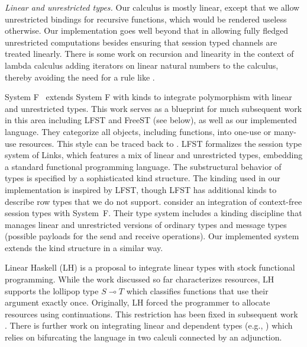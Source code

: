 \smallskip
\emph{Linear and unrestricted types.}
Our 
calculus is mostly linear, except that we
allow unrestricted bindings for recursive functions, which would be
rendered useless otherwise. 
Our implementation goes well beyond that in
allowing fully fledged unrestricted computations besides ensuring that
session typed channels are treated linearly.
%
There is some work on recursion and linearity in the context of lambda calculus
\cite{DBLP:journals/lisp/AlvesFFM10}
adding iterators on
linear natural numbers to the calculus, thereby avoiding the need for
a rule like {}.

System F\textdegree~\cite{DBLP:conf/tldi/MazurakZZ10}
extends System F with kinds to integrate polymorphism with linear and
unrestricted types. This work serves as a blueprint for much
subsequent work in this area including LFST and FreeST (see below), as well as our
implemented language.
They categorize all objects, including functions, into one-use or
many-use resources. This style can be traced back to 
\citet{walker:substructural-type-systems}. 
%
LFST \cite{lindley17:_light_funct_session_types} formalizes the
session type system of Links, which features a mix of linear and
unrestricted types, embedding a standard functional programming
language. The substructural behavior of types is specified by a
sophisticated kind structure.  The kinding used in our implementation
is inspired by LFST, though LFST has additional kinds to describe row
types that we do not support.
%
\citet{DBLP:journals/corr/abs-2106-06658}
consider an integration of context-free session types with
System~F. Their type system includes a kinding discipline that manages
linear and unrestricted versions of ordinary types and
message types (possible payloads for the send and receive
operations). Our implemented system extends the kind structure in a
similar way.

Linear Haskell (LH) \cite{DBLP:journals/pacmpl/BernardyBNJS18}
is a proposal to integrate linear types with stock functional
programming. While the work discussed so far characterizes resources,
LH supports the lollipop type $S \multimap T$ which classifies
functions that use their argument exactly once. Originally, LH forced
the programmer to allocate resources using continuations. This restriction
has been fixed in subsequent work \cite{DBLP:journals/pacmpl/SpiwackKBWE22}.
%
There is further work on integrating linear and dependent types (e.g.,
\cite{DBLP:conf/popl/KrishnaswamiPB15}) which relies on
bifurcating the language in two calculi connected by an adjunction.


